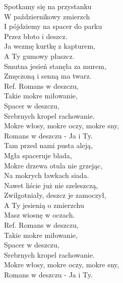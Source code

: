 
Spotkamy się na przystanku\\
W październikowy zmierzch\\
I pójdziemy na spacer do parku\\
Przez błoto i deszcz.\\
Ja wezmę kurtkę z kapturem,\\
A Ty gumowy płaszcz.\\
Smutna jesień stanęła za murem,\\
Zmęczoną i senną ma twarz.\\
\hops
Ref. Romans w deszczu,\\
 Takie mokre miłowanie,\\
 Spacer w deszczu,\\
 Srebrnych kropel rachowanie.\\
 Mokre włosy, mokre oczy, mokre sny,\\
 Romans w deszczu - Ja i Ty.        \\
\hops
Tam przed nami pusta aleją,\\
Mgła spaceruje blada,\\
Mokre drzewa otula nie grzejąc,\\
Na mokrych ławkach siada.\\
Nawet liście już nie szeleszczą,\\
Zwilgotniały, deszcz je zamoczył,\\
A Ty jesienią o zmierzchu\\
Masz wiosnę w oczach.\\
\hops
Ref. Romans w deszczu,\\
 Takie mokre miłowanie,\\
 Spacer w deszczu,\\
 Srebrnych kropel rachowanie.\\
 Mokre włosy, mokre oczy, mokre sny,\\
 Romans w deszczu - Ja i Ty.
